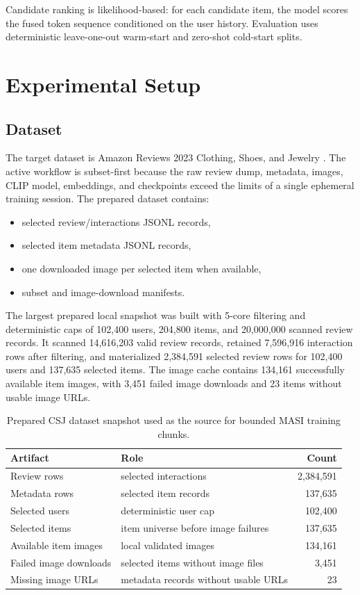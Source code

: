 \documentclass[conference]{IEEEtran}
\begin{document}
Candidate ranking is likelihood-based: for each candidate item, the model scores the fused token sequence conditioned on the user history. Evaluation uses deterministic leave-one-out warm-start and zero-shot cold-start splits.

\section{Experimental Setup}
\subsection{Dataset}
The target dataset is Amazon Reviews 2023 Clothing, Shoes, and Jewelry \cite{amazon_reviews_2023}. The active workflow is subset-first because the raw review dump, metadata, images, CLIP model, embeddings, and checkpoints exceed the limits of a single ephemeral training session. The prepared dataset contains:
\begin{itemize}
    \item selected review/interactions JSONL records,
    \item selected item metadata JSONL records,
    \item one downloaded image per selected item when available,
    \item subset and image-download manifests.
\end{itemize}

The largest prepared local snapshot was built with 5-core filtering and deterministic caps of 102,400 users, 204,800 items, and 20,000,000 scanned review records. It scanned 14,616,203 valid review records, retained 7,596,916 interaction rows after filtering, and materialized 2,384,591 selected review rows for 102,400 users and 137,635 selected items. The image cache contains 134,161 successfully available item images, with 3,451 failed image downloads and 23 items without usable image URLs.

\begin{table}[t]
\centering
\caption{Prepared CSJ dataset snapshot used as the source for bounded MASI training chunks.}
\label{tab:prepared_dataset}
\renewcommand{\arraystretch}{1.12}
\begin{tabularx}{\columnwidth}{@{}lXr@{}}
\toprule
\textbf{Artifact} & \textbf{Role} & \textbf{Count} \\
\midrule
Review rows & selected interactions & 2,384,591 \\
Metadata rows & selected item records & 137,635 \\
Selected users & deterministic user cap & 102,400 \\
Selected items & item universe before image failures & 137,635 \\
Available item images & local validated images & 134,161 \\
Failed image downloads & selected items without image files & 3,451 \\
Missing image URLs & metadata records without usable URLs & 23 \\
\bottomrule
\end{tabularx}
\end{table}
\end{document}
